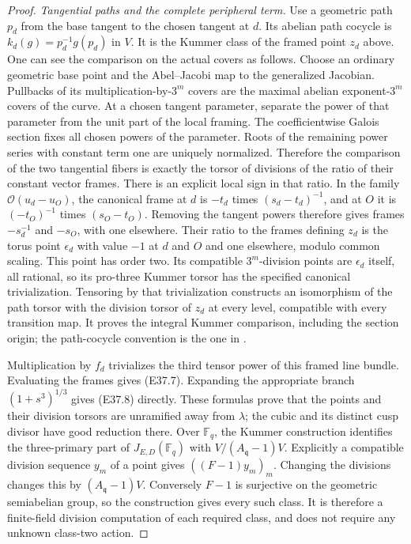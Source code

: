 \begin{proof}
\emph{Tangential paths and the complete peripheral term.}
Use a geometric path $p_d$ from the base tangent to
the chosen tangent at $d$. Its abelian path cocycle is
$k_d(g)=p_d^{-1}g(p_d)$ in $V$.
It is the Kummer class of the framed point $z_d$ above.
One can see the comparison on the actual covers as
follows. Choose an ordinary geometric base point and
the Abel--Jacobi map to the generalized Jacobian.
Pullbacks of its multiplication-by-$3^m$ covers are
the maximal abelian exponent-$3^m$ covers of the curve.
At a chosen tangent parameter, separate the power of
that parameter from the unit part of the local
framing. The coefficientwise Galois section fixes all
chosen powers of the parameter. Roots of the remaining
power series with constant term one are uniquely
normalized. Therefore the comparison of the two
tangential fibers is exactly the torsor of divisions
of the ratio of their constant vector frames.
There is an explicit local sign in that ratio. In
the family $\mathcal O(u_d-u_O)$, the canonical frame
at $d$ is $-t_d$ times $(s_d-t_d)^{-1}$, and at $O$
it is $(-t_O)^{-1}$ times $(s_O-t_O)$. Removing the
tangent powers therefore gives frames $-s_d^{-1}$
and $-s_O$, with one elsewhere. Their ratio to the
frames defining $z_d$ is the torus point $\epsilon_d$
with value $-1$ at $d$ and $O$ and one elsewhere,
modulo common scaling. This point has order two.
Its compatible $3^m$-division points are
$\epsilon_d$ itself, all rational, so its pro-three
Kummer torsor has the specified canonical trivialization.
Tensoring by that trivialization constructs an
isomorphism of the path torsor with the division
torsor of $z_d$ at every level, compatible with
every transition map.
It proves the integral Kummer comparison, including
the section origin; the path-cocycle convention is
the one in \cite[(12.4)--(12.10)]{E_WickelgrenThree}.

Multiplication by $f_d$ trivializes the third tensor
power of this framed line bundle. Evaluating the
frames gives (E37.7). Expanding the appropriate branch
$(1+s^3)^{1/3}$ gives (E37.8) directly. These formulas
prove that the points and their division torsors are
unramified away from $\lambda$; the cubic and its
distinct cusp divisor have good reduction there.
Over $\mathbb F_q$, the Kummer construction identifies
the three-primary part of $J_{E,D}(\mathbb F_q)$ with
$V/(A_{\mathfrak q}-1)V$. Explicitly a compatible
division sequence $y_m$ of a point gives
$((F-1)y_m)_m$. Changing the divisions changes this by
$(A_{\mathfrak q}-1)V$. Conversely $F-1$ is surjective
on the geometric semiabelian group, so the construction
gives every such class. It is therefore a finite-field
division computation of each required class, and does
not require any unknown class-two action.


\end{proof}
